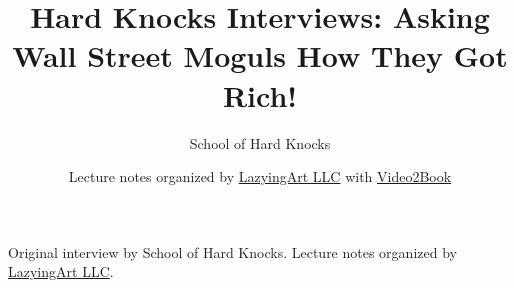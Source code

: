 \documentclass[11pt,oneside]{book}
\begin{document}
\frontmatter
\title{Hard Knocks Interviews: Asking Wall Street Moguls How They Got Rich!}
\author{School of Hard Knocks}
\date{Lecture notes organized by \href{https://lazying.art}{LazyingArt LLC} with \href{https://github.com/lachlanchen/Video2Book}{Video2Book}}
\maketitle
\begin{center}
\small Original interview by School of Hard Knocks. Lecture notes organized by \href{https://lazying.art}{LazyingArt LLC}.
\end{center}
\clearpage
\mainmatter

\end{document}
